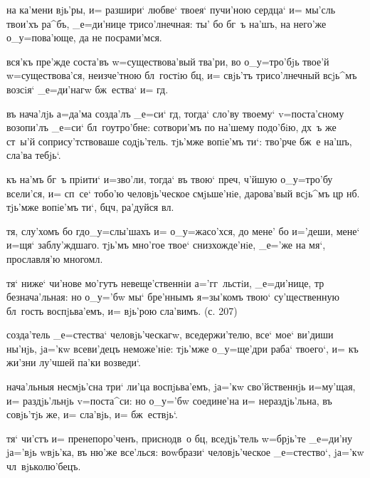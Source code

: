   на ка'мени вjь'ры, и= разшири` 
любве` твоея` пучи'ною сердца` и= мы'сль твои'хъ ра^бъ, 
_е=ди'нице трисо'лнечная: ты' бо бг~ъ на'шъ, на него'же 
о_у=пова'юще, да не посрами'мся.

  вся'къ пре'жде соста'въ 
w=существова'вый тва'ри, во о_у=тро'бjь твое'й 
w=существова'ся, неизче'тною бл~гостiю бц, и= свjь'тъ 
трисо'лнечный всjь^мъ возсiя` _е=ди'нагw бж~ества` и= 
гд.


 

 въ нача'лjь а=да'ма созда'лъ _е=си` гд, 
тогда` сло'ву твоему` v=поста'сному возопи'лъ _е=си` 
бл~гоутро'бне: сотвори'мъ по на'шему подо'бiю, дх~ъ же 
ст~ы'й сопрису'тствоваше содjь'тель. тjь'мже вопiе'мъ 
ти`: тво'рче бж~е на'шъ, сла'ва тебjь`.

     къ на'мъ 
бг~ъ прiити` и=зво'ли, тогда` въ твою` преч, 
ч'йшую о_у=тро'бу всели'ся, и= сп~се` тобо'ю 
человjь'ческое смjьше'нiе, дарова'вый всjь^мъ цр 
нб. тjь'мже вопiе'мъ ти`, бц ч, ра'дуйся 
вл.


  тя, слу'хомъ бо гд о_у=слы'шахъ 
и= о_у=жасо'хся, до мене' бо и='деши, мене` и=щя` 
заблу'ждшаго. тjь'мъ мно'гое твое` снизхожде'нiе, _е='же 
на мя`, прославля'ю многомл.

 тя` ниже` чи'нове мо'гутъ 
невеще'ственнiи а='гг~льстiи, _е=ди'нице, тр 
безнача'льная: но о_у='бw мы` бре'ннымъ я=зы'комъ твою` 
су'щественную бл~гость воспjьва'емъ, и= вjь'рою сла'вимъ. 
(с. 207)

 созда'тель _е=стества` человjь'ческагw, 
вседержи'телю, все` мое` ви'диши ны'нjь, jа='кw 
всеви'децъ неможе'нiе: тjь'мже о_у=ще'дри раба` твоего`, 
и= къ жи'зни лу'чшей па'ки возведи`.

  нача'льныя несмjь'сна три` 
ли'ца воспjьва'емъ, jа='кw сво'йственнjь и=му'щая, и= 
раздjь'льнjь v=поста^си: но о_у='бw соедине'на и= 
нераздjь'льна, въ совjь'тjь же, и= сла'вjь, и= 
бж~ествjь`.

  тя` чи'стъ и= 
пренепоро'ченъ, приснодв~о бц, вседjь'тель w=брjь'те 
_е=ди'ну jа='вjь w\т вjь'ка, въ ню'же все'лься: воwбрази` 
человjь'ческое _е=стество`, jа='кw чл~вjьколю'бецъ.


